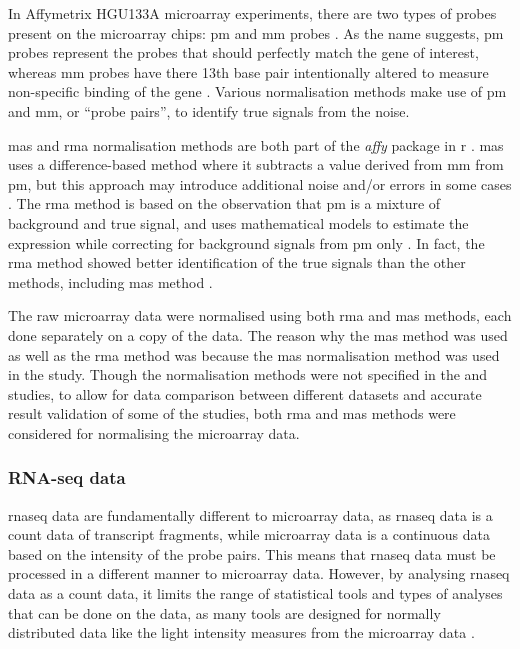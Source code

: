 In Affymetrix HGU133A microarray experiments, there are two types of probes present on the microarray chips: \gls{pm} and \gls{mm} probes \citep{Irizarry2003}.
As the name suggests, \gls{pm} probes represent the probes that should perfectly match the gene of interest, whereas \gls{mm} probes have there 13th base pair intentionally altered to measure non-specific binding of the gene \citep{Irizarry2003}.
Various normalisation methods make use of \gls{pm} and \gls{mm}, or ``probe pairs'', to identify true signals from the noise.

\Gls{mas} and \gls{rma} normalisation methods are both part of the \textit{affy} package in \gls{r} \citep{Gautier2004}.
\Gls{mas} uses a difference-based method where it subtracts a value derived from \gls{mm} from \gls{pm}, but this approach may introduce additional noise and/or errors in some cases \citep{Irizarry2003}.
The \gls{rma} method is based on the observation that \gls{pm} is a mixture of background and true signal, and uses mathematical models to estimate the expression while correcting for background signals from \gls{pm} only \citep{Irizarry2003}.
In fact, the \gls{rma} method showed better identification of the true signals than the other methods, including \Gls{mas} method \citep{Irizarry2003}.

The raw microarray data were normalised using both \gls{rma} and \gls{mas} methods, each done separately on a copy of the data.
The reason why the \gls{mas} method was used as well as the \gls{rma} method was because the \gls{mas} normalisation method was used in the \citet{Gatza2010a} study.
Though the normalisation methods were not specified in the \citet{Creighton2012} and \citet{Fuentes-Mattei2014} studies, to allow for data comparison between different datasets and accurate result validation of some of the studies, both \gls{rma} and \gls{mas} methods were considered for normalising the microarray data.

\subsubsection{RNA-seq data}
\label{ssub:rna_seq_data}

\gls{rnaseq} data are fundamentally different to microarray data, as \gls{rnaseq} data is a count data of transcript fragments, while microarray data is a continuous data based on the intensity of the probe pairs.
This means that \gls{rnaseq} data must be processed in a different manner to microarray data.
However, by analysing \gls{rnaseq} data as a count data, it limits the range of statistical tools and types of analyses that can be done on the data, as many tools are designed for normally distributed data like the light intensity measures from the microarray data \citep{Law2014}.

